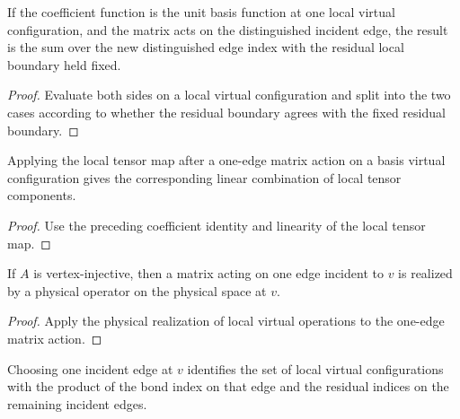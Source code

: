 \begin{theorem}%
    \label{thm:peps_localIncidentMatrixOp_single}
    \leanok
    If the coefficient function is the unit basis function at one local virtual
    configuration, and the matrix acts on the distinguished incident edge, the
    result is the sum over the new distinguished edge index with the residual
    local boundary held fixed.
\end{theorem}
\begin{proof}\leanok
    Evaluate both sides on a local virtual configuration and split into the
    two cases according to whether the residual boundary agrees with the fixed
    residual boundary.
\end{proof}

\begin{theorem}%
    \label{thm:peps_localTensorMap_localIncidentMatrixOp_single}
    \leanok
    Applying the local tensor map after a one-edge matrix action on a basis
    virtual configuration gives the corresponding linear combination of local
    tensor components.
\end{theorem}
\begin{proof}\leanok
    Use the preceding coefficient identity and linearity of the local tensor
    map.
\end{proof}

\begin{theorem}%
    \label{thm:peps_localIncidentMatrixOp_physicalRealization}
    \leanok
    If $A$ is vertex-injective, then a matrix acting on one edge incident to
    $v$ is realized by a physical operator on the physical space at $v$.
\end{theorem}
\begin{proof}\leanok
    Apply the physical realization of local virtual operations to the
    one-edge matrix action.
\end{proof}

\begin{definition}%
    \label{def:peps_localVirtualConfigSplitAt}
    \leanok
    Choosing one incident edge at $v$ identifies the set of local virtual
    configurations with the product of the bond index on that edge and the
    residual indices on the remaining incident edges.
\end{definition}

